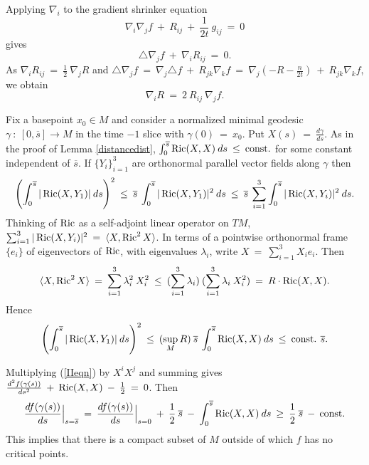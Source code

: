 Applying $\nabla_i$ to the gradient shrinker equation
\begin{equation} \label{IIeqn}
\nabla_i \nabla_j f \: + \: R_{ij} \: + \: \frac{1}{2t} \: g_{ij}
\: = \: 0
\end{equation}
gives
\begin{equation}
\triangle \nabla_j f \: + \: \nabla_i R_{ij} \: = \: 0.
\end{equation}
As $\nabla_i R_{ij} \: = \: \frac{1}{2} \: \nabla_j R$ and
$\triangle \nabla_j f \: = \: \nabla_j \triangle f \: + \:
R_{jk} \nabla_k f \: = \: \nabla_j \left( -R-\frac{n}{2t} \right) \: + \:
R_{jk} \nabla_k f$,
we obtain
\begin{equation} \label{gradR}
\nabla_i R \: = \: 2 \: R_{ij} \: \nabla_j f.
\end{equation}

Fix a basepoint $x_0 \in M$ and consider a normalized minimal geodesic
$\gamma \: : \: [0, \overline{s}] \rightarrow M$ in the time $-1$ slice
with $\gamma(0) \: = \: x_0$. Put $X(s) \: = \: \frac{d\gamma}{ds}$.
As in the proof of Lemma \ref{distancedist},
$\int_0^{\overline{s}} \operatorname{Ric}(X, X) \: ds \: \le \:
\operatorname{const.}$ for some constant independent of $\overline{s}$.
If $\{Y_i\}_{i=1}^3$ are orthonormal parallel vector fields along $\gamma$
then
\begin{equation}
\left( \int_0^{\overline{s}} |\operatorname{Ric}(X, Y_1)| \: ds \right)^2 \: \le \:
\overline{s} \: \int_0^{\overline{s}} |\operatorname{Ric}(X, Y_1)|^2 \: ds \: \le \:
\overline{s} \: \sum_{i=1}^3 \int_0^{\overline{s}} |\operatorname{Ric}(X, Y_i)|^2 \: ds.
\end{equation}
Thinking of $\operatorname{Ric}$ as a self-adjoint linear operator on $TM$,
$\sum_{i=1}^3 |\operatorname{Ric}(X, Y_i)|^2 \: = \: \langle X, \operatorname{Ric}^2 X \rangle$.
In terms of a pointwise orthonormal frame  $\{e_i\}$
of eigenvectors of $\operatorname{Ric}$,
with eigenvalues $\lambda_i$, write $X \: = \: \sum_{i=1}^3 X_i e_i$.
Then
\begin{equation}
\langle X, \operatorname{Ric}^2 X \rangle \: = \: \sum_{i=1}^3 \lambda_i^2 \: X_i^2
\: \le \: (\sum_{i=1}^3 \lambda_i) \: (\sum_{i=1}^3 \lambda_i \: X_i^2)
\: = \: R \cdot \operatorname{Ric}(X, X).
\end{equation}
Hence
\begin{equation}
\left( \int_0^{\overline{s}} |\operatorname{Ric}(X, Y_1)| \: ds \right)^2 \: \le \:
(\sup_M R) \: \overline{s} \:
\int_0^{\overline{s}} \operatorname{Ric}(X, X) \: ds \: \le \:
\operatorname{const.} \: \overline{s}.
\end{equation}

Multiplying (\ref{IIeqn}) by $X^i X^j$ and summing gives
$\frac{d^2f(\gamma(s))}{ds^2} \: + \: \operatorname{Ric}(X, X) \: - \: \frac{1}{2}
\: =\: 0$. Then
\begin{equation}
\frac{d f(\gamma(s))}{ds} \Big|_{s = \overline{s}} \: = \:
\frac{d f(\gamma(s))}{ds} \Big|_{s = 0} \: + \:
\frac{1}{2} \: \overline{s} \: - \: \int_0^{\overline{s}} \operatorname{Ric}(X, X) \: ds
\: \ge \: \frac{1}{2} \: \overline{s} \: - \: \operatorname{const.}
\end{equation}
This implies that there is a compact subset of $M$ outside of which
$f$ has no critical points.

